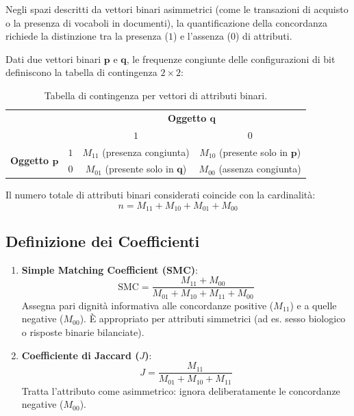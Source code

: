 Negli spazi descritti da vettori binari asimmetrici (come le transazioni di acquisto o la presenza di vocaboli in documenti), la quantificazione della concordanza richiede la distinzione tra la presenza ($1$) e l'assenza ($0$) di attributi.

Dati due vettori binari $\mathbf{p}$ e $\mathbf{q}$, le frequenze congiunte delle configurazioni di bit definiscono la tabella di contingenza $2 \times 2$:
\begin{table}[htbp]
\centering
\small
\begin{tabular}{cc|cc}
\toprule
& & \multicolumn{2}{c}{\textbf{Oggetto $\mathbf{q}$}} \\
& & $1$ & $0$ \\
\midrule
\multirow{2}{*}{\textbf{Oggetto $\mathbf{p}$}} & $1$ & $M_{11}$ (presenza congiunta) & $M_{10}$ (presente solo in $\mathbf{p}$) \\
& $0$ & $M_{01}$ (presente solo in $\mathbf{q}$) & $M_{00}$ (assenza congiunta) \\
\bottomrule
\end{tabular}
\caption{Tabella di contingenza per vettori di attributi binari.}
\label{tab:dm-contingency-binary}
\end{table}

Il numero totale di attributi binari considerati coincide con la cardinalità:
\begin{equation}
    n = M_{11} + M_{10} + M_{01} + M_{00}
\end{equation}

\subsection{Definizione dei Coefficienti}
\begin{enumerate}
    \item \textbf{Simple Matching Coefficient (SMC)}:
    \begin{equation}
        \text{SMC} = \frac{M_{11} + M_{00}}{M_{01} + M_{10} + M_{11} + M_{00}}
    \end{equation}
    Assegna pari dignità informativa alle concordanze positive ($M_{11}$) e a quelle negative ($M_{00}$). È appropriato per attributi simmetrici (ad es. sesso biologico o risposte binarie bilanciate).
    \item \textbf{Coefficiente di Jaccard ($J$)}:
    \begin{equation}
        J = \frac{M_{11}}{M_{01} + M_{10} + M_{11}}
    \end{equation}
    Tratta l'attributo come asimmetrico: ignora deliberatamente le concordanze negative ($M_{00}$).
\end{enumerate}

